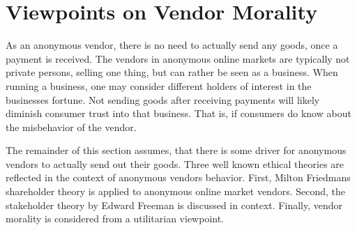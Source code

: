 \section{Viewpoints on Vendor Morality}
\label{vendors}

As an anonymous vendor, there is no need to actually send any goods, once a payment is received. The vendors in anonymous online markets are typically not private persons, selling one thing, but can rather be seen as a business\cite{silkroad2013}. When running a business, one may consider different holders of interest in the businesses fortune. Not sending goods after receiving payments will likely diminish consumer trust into that business. That is, if consumers do know about the misbehavior of the vendor.

The remainder of this section assumes, that there is some driver for anonymous vendors to actually send out their goods. Three well known ethical theories are reflected in the context of anonymous vendors behavior. First, Milton Friedmans shareholder theory is applied to anonymous online market vendors. Second, the stakeholder theory by Edward Freeman is discussed in context. Finally, vendor morality is considered from a utilitarian viewpoint.




